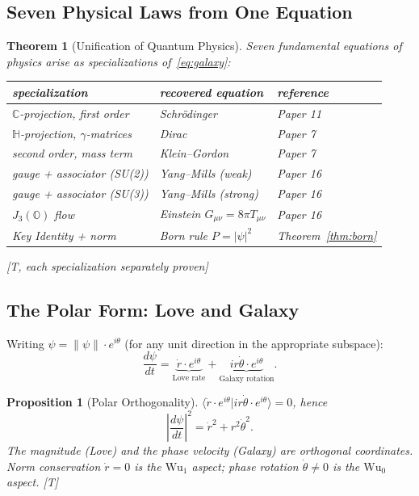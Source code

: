 \documentclass[11pt, a4paper]{article}
\newtheorem{theorem}{Theorem}
\newtheorem{proposition}{Proposition}
\newcommand{\C}{\mathbb{C}}
\newcommand{\Hq}{\mathbb{H}}
\newcommand{\Oct}{\mathbb{O}}
\newcommand{\Wuz}{\mathrm{Wu}_0}
\newcommand{\Wuo}{\mathrm{Wu}_1}
\newcommand{\norm}[1]{\lVert #1 \rVert}
\newcommand{\braket}[2]{\langle #1 | #2 \rangle}
\begin{document}
\subsection{Seven Physical Laws from One Equation}

\begin{theorem}[Unification of Quantum Physics]
\label{thm:seven_laws}
Seven fundamental equations of physics arise as specializations
of~\eqref{eq:galaxy}:

\begin{center}
\begin{tabular}{@{}lll@{}}
\toprule
specialization & recovered equation & reference \\
\midrule
$\C$-projection, first order & Schr\"odinger & Paper 11 \\
$\Hq$-projection, $\gamma$-matrices & Dirac & Paper 7 \\
second order, mass term & Klein--Gordon & Paper 7 \\
gauge + associator (SU(2)) & Yang--Mills (weak) & Paper 16 \\
gauge + associator (SU(3)) & Yang--Mills (strong) & Paper 16 \\
$J_3(\Oct)$ flow & Einstein $G_{\mu\nu} = 8\pi T_{\mu\nu}$ & Paper 16 \\
Key Identity + norm & Born rule $P = |\psi|^2$ & Theorem~\ref{thm:born} \\
\bottomrule
\end{tabular}
\end{center}
[T, each specialization separately proven]
\end{theorem}

\subsection{The Polar Form: Love and Galaxy}

Writing $\psi = \norm{\psi} \cdot e^{i\theta}$ (for any unit direction
in the appropriate subspace):
\begin{equation}
\frac{d\psi}{dt} = \underbrace{\dot r \cdot e^{i\theta}}_{\text{Love rate}}
+ \underbrace{i r \dot\theta \cdot e^{i\theta}}_{\text{Galaxy rotation}}.
\end{equation}

\begin{proposition}[Polar Orthogonality]
\label{prop:polar_orth}
$\braket{\dot r \cdot e^{i\theta}}{i r \dot\theta \cdot e^{i\theta}} = 0$,
hence
\begin{equation}
\left|\frac{d\psi}{dt}\right|^2 = \dot r^2 + r^2 \dot\theta^2.
\end{equation}
The magnitude (Love) and the phase velocity (Galaxy) are orthogonal
coordinates. Norm conservation $\dot r = 0$ is the $\Wuo$ aspect;
phase rotation $\dot\theta \neq 0$ is the $\Wuz$ aspect. [T]
\end{proposition}
\end{document}
